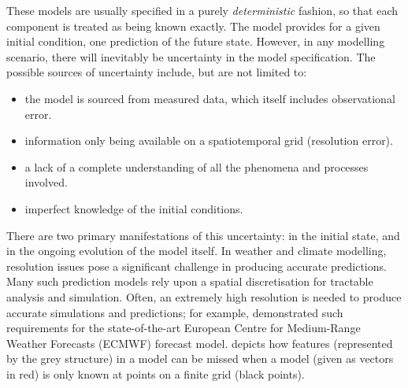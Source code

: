 These models are usually specified in a purely \emph{deterministic} fashion, so that each component is treated as being known exactly.
The model provides for a given initial condition, one prediction of the future state.
However, in any modelling scenario, there will inevitably be uncertainty in the model specification.
The possible sources of uncertainty include, but are not limited to:
\begin{itemize}
	\item the model is sourced from measured data, which itself includes observational error.
	\item information only being available on a spatiotemporal grid (resolution error).
	\item a lack of a complete understanding of all the phenomena and processes involved.
	\item imperfect knowledge of the initial conditions.
\end{itemize}
There are two primary manifestations of this uncertainty: in the initial state, and in the ongoing evolution of the model itself.
In weather and climate modelling, resolution issues pose a significant challenge in producing accurate predictions.
Many such prediction models rely upon a spatial discretisation for tractable analysis and simulation.
Often, an extremely high resolution is needed to produce accurate simulations and predictions; for example, \citet{DawsonEtAl_2012_SimulatingRegimeStructures} demonstrated such requirements for the state-of-the-art European Centre for Medium-Range Weather Forecasts (ECMWF) forecast model.
 depicts how features (represented by the grey structure) in a model can be missed when a model (given as vectors in red) is only known at points on a finite grid (black points).


